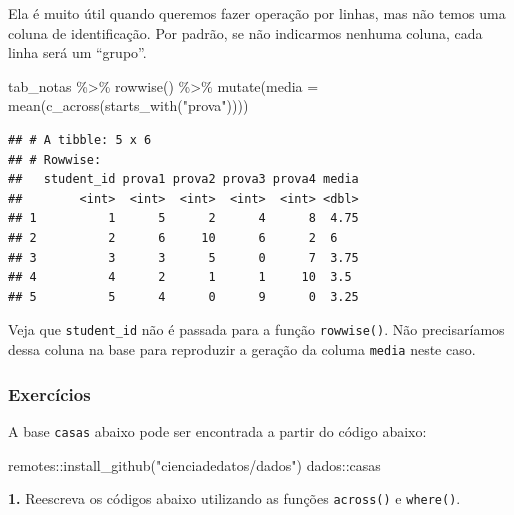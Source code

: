 \documentclass[
]{book}
\newenvironment{Shaded}{\begin{snugshade}}{\end{snugshade}}
\newcommand{\AttributeTok}[1]{\textcolor[rgb]{0.77,0.63,0.00}{#1}}
\newcommand{\FunctionTok}[1]{\textcolor[rgb]{0.00,0.00,0.00}{#1}}
\newcommand{\NormalTok}[1]{#1}
\newcommand{\SpecialCharTok}[1]{\textcolor[rgb]{0.00,0.00,0.00}{#1}}
\newcommand{\StringTok}[1]{\textcolor[rgb]{0.31,0.60,0.02}{#1}}
\begin{document}
Ela é muito útil quando queremos fazer operação por linhas, mas não temos uma coluna de identificação. Por padrão, se não indicarmos nenhuma coluna, cada linha será um ``grupo''.

\begin{Shaded}
\begin{Highlighting}[]
\NormalTok{tab\_notas }\SpecialCharTok{\%\textgreater{}\%}
  \FunctionTok{rowwise}\NormalTok{() }\SpecialCharTok{\%\textgreater{}\%}
  \FunctionTok{mutate}\NormalTok{(}\AttributeTok{media =} \FunctionTok{mean}\NormalTok{(}\FunctionTok{c\_across}\NormalTok{(}\FunctionTok{starts\_with}\NormalTok{(}\StringTok{"prova"}\NormalTok{))))}
\end{Highlighting}
\end{Shaded}

\begin{verbatim}
## # A tibble: 5 x 6
## # Rowwise: 
##   student_id prova1 prova2 prova3 prova4 media
##        <int>  <int>  <int>  <int>  <int> <dbl>
## 1          1      5      2      4      8  4.75
## 2          2      6     10      6      2  6   
## 3          3      3      5      0      7  3.75
## 4          4      2      1      1     10  3.5 
## 5          5      4      0      9      0  3.25
\end{verbatim}

Veja que \texttt{student\_id} não é passada para a função \texttt{rowwise()}. Não precisaríamos dessa coluna na base para reproduzir a geração da columa \texttt{media} neste caso.

\hypertarget{exercuxedcios-17}{%
\subsubsection*{Exercícios}\label{exercuxedcios-17}}

A base \texttt{casas} abaixo pode ser encontrada a partir do código abaixo:

\begin{Shaded}
\begin{Highlighting}[]
\NormalTok{remotes}\SpecialCharTok{::}\FunctionTok{install\_github}\NormalTok{(}\StringTok{"cienciadedatos/dados"}\NormalTok{)}
\NormalTok{dados}\SpecialCharTok{::}\NormalTok{casas}
\end{Highlighting}
\end{Shaded}

\textbf{1.} Reescreva os códigos abaixo utilizando as funções \texttt{across()} e \texttt{where()}.
\end{document}
